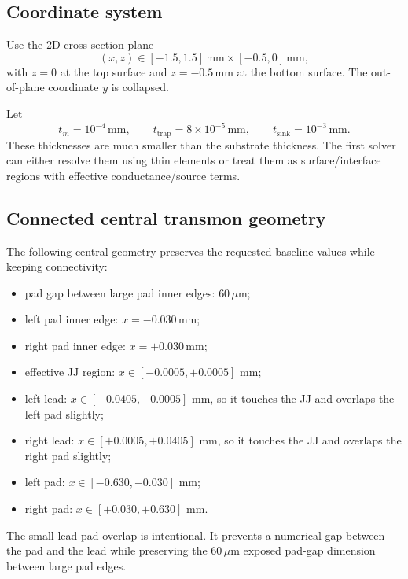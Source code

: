 \documentclass[11pt]{article}
\begin{document}
\subsection{Coordinate system}
Use the 2D cross-section plane
\begin{equation}
    (x,z) \in [-1.5,1.5]\,\mathrm{mm}\times[-0.5,0]\,\mathrm{mm},
\end{equation}
with $z=0$ at the top surface and $z=-0.5\,\mathrm{mm}$ at the bottom surface. The out-of-plane coordinate $y$ is collapsed.

Let
\begin{equation}
    t_m=10^{-4}\,\mathrm{mm},\qquad
    t_{\mathrm{trap}}=8\times10^{-5}\,\mathrm{mm},\qquad
    t_{\mathrm{sink}}=10^{-3}\,\mathrm{mm}.
\end{equation}
These thicknesses are much smaller than the substrate thickness. The first solver can either resolve them using thin elements or treat them as surface/interface regions with effective conductance/source terms.

\subsection{Connected central transmon geometry}
The following central geometry preserves the requested baseline values while keeping connectivity:
\begin{itemize}[leftmargin=1.5em]
    \item pad gap between large pad inner edges: $60\,\mu\mathrm{m}$;
    \item left pad inner edge: $x=-0.030\,\mathrm{mm}$;
    \item right pad inner edge: $x=+0.030\,\mathrm{mm}$;
    \item effective JJ region: $x\in[-0.0005,+0.0005]$ mm;
    \item left lead: $x\in[-0.0405,-0.0005]$ mm, so it touches the JJ and overlaps the left pad slightly;
    \item right lead: $x\in[+0.0005,+0.0405]$ mm, so it touches the JJ and overlaps the right pad slightly;
    \item left pad: $x\in[-0.630,-0.030]$ mm;
    \item right pad: $x\in[+0.030,+0.630]$ mm.
\end{itemize}
The small lead-pad overlap is intentional. It prevents a numerical gap between the pad and the lead while preserving the $60\,\mu\mathrm{m}$ exposed pad-gap dimension between large pad edges.
\end{document}
